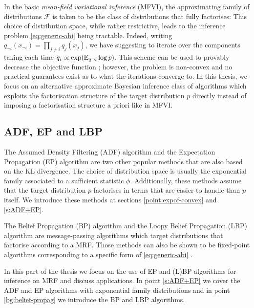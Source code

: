 In the basic \emph{mean-field variational inference} (MFVI), the approximating family of distributions $\mathcal F$ is taken to be the class of distributions that fully factorises:
%
% 
This choice of distribution space, while rather restrictive, leads to the inference problem \eqref{eq:generic-abi} being tractable. Indeed, writing $q_{\neg i}(x_{\neg i}) = \prod_{j\neq i} q_{j}(x_{j}) $, we have
suggesting to iterate over the components taking each time $q_{i} \propto \exp(\mathbb E_{q\neg i} \log p) $. This scheme can be used to provably decrease the objective function \citep{hoffman13, kucukelbir16, blei16}; however, the problem is non-convex and no practical guarantees exist as to what the iterations converge to. 
In this thesis, we focus on an alternative approximate Bayesian inference class of algorithms which exploits the factorisation structure of the target distribution $p$ directly instead of imposing a factorisation structure a priori like in MFVI.

\subsection{ADF, EP and LBP}
The Assumed Density Filtering (ADF) algorithm and the  Expectation Propagation (EP) algorithm are two other popular methods that are also based on the KL divergence. The choice of distribution space is usually the exponential family associated to a sufficient statistic $\phi$. Additionally, these methods assume that the target distribution $p$ factorises in terms that are easier to handle than $p$ itself. We introduce these methods at sections \ref{point:expof-convex} and \ref{s:ADF+EP}.

The Belief Propagation (BP) algorithm and the Loopy Belief Propagation (LBP) algorithm are message-passing algorithms which target distributions that factorise according to a MRF. Those methods can also be shown to be fixed-point algorithms corresponding to a specific form of \eqref{eq:generic-abi} \citep{yedidia01, yedidia02}.

In this part of the thesis we focus on the use of EP and (L)BP algorithms for inference on MRF and discuss applications. In point \ref{s:ADF+EP} we cover the ADF and EP algorithms with exponential family distributions and in point \ref{bg:belief-propag} we introduce the BP and LBP algorithms.




